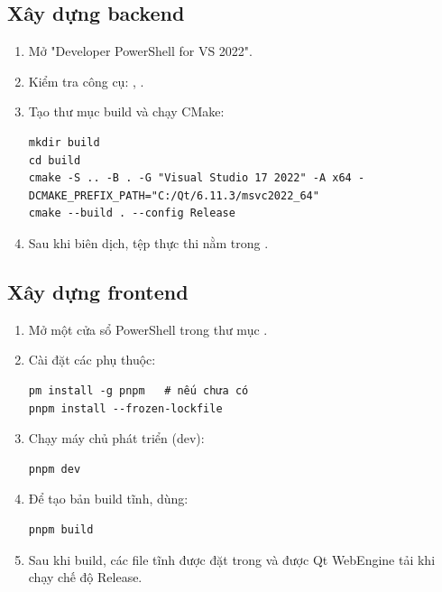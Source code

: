 \subsection{Xây dựng backend}
\label{subsec:backend_build}
\begin{enumerate}
    \item Mở "Developer PowerShell for VS 2022".
    \item Kiểm tra công cụ: , .
    \item Tạo thư mục build và chạy CMake:
    \begin{lstlisting}[caption={Câu lệnh build backend}, label={lst:backend_build}]
mkdir build
cd build
cmake -S .. -B . -G "Visual Studio 17 2022" -A x64 -DCMAKE_PREFIX_PATH="C:/Qt/6.11.3/msvc2022_64"
cmake --build . --config Release
\end{lstlisting}
    \item Sau khi biên dịch, tệp thực thi  nằm trong .
\end{enumerate}

\subsection{Xây dựng frontend}
\label{subsec:frontend_build}
\begin{enumerate}
    \item Mở một cửa sổ PowerShell trong thư mục .
    \item Cài đặt các phụ thuộc:
    \begin{lstlisting}[caption={Cài đặt phụ thuộc frontend}, label={lst:frontend_deps}]
pm install -g pnpm   # nếu chưa có
pnpm install --frozen-lockfile
\end{lstlisting}
    \item Chạy máy chủ phát triển (dev):
    \begin{lstlisting}[caption={Khởi động Vite dev server}, label={lst:frontend_dev}]
pnpm dev
\end{lstlisting}
    \item Để tạo bản build tĩnh, dùng:
    \begin{lstlisting}[caption={Build frontend}, label={lst:frontend_build}]
pnpm build
\end{lstlisting}
    \item Sau khi build, các file tĩnh được đặt trong  và được Qt WebEngine tải khi chạy chế độ Release.
\end{enumerate}

